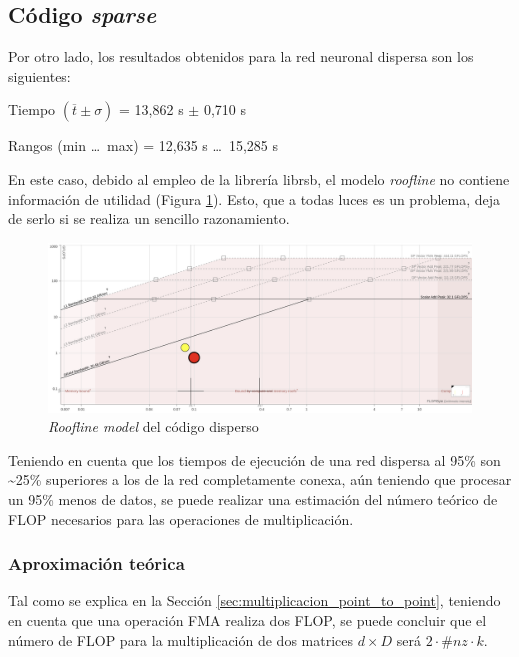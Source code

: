 \subsection{Código \textit{sparse}}
Por otro lado, los resultados obtenidos para la red neuronal dispersa son los siguientes:

\begin{center}
Tiempo $(\overline{t} \pm \sigma)$ = 13,862 s $\pm$ 0,710 s

Rangos (min \ldots\ max) = 12,635 s \ldots\ 15,285 s
\end{center}

En este caso, debido al empleo de la librería librsb, el modelo \textit{roofline} no contiene información de utilidad (Figura \ref{fig:roofline_sparse_details}). Esto, que a todas luces es un problema, deja de serlo si se realiza un sencillo razonamiento.

\begin{figure}[h!]
    \centering
    \includegraphics[width=\textwidth]{img/roofline_sparse.png}
    \caption{\textit{Roofline model} del código disperso}
    \label{fig:roofline_sparse_details}
\end{figure}

Teniendo en cuenta que los tiempos de ejecución de una red dispersa al 95\% son \textasciitilde25\% superiores a los de la red completamente conexa, aún teniendo que procesar un 95\% menos de datos, se puede realizar una estimación del número teórico de FLOP necesarios para las operaciones de multiplicación.

\subsubsection{Aproximación teórica}
Tal como se explica en la Sección \ref{sec:multiplicacion_point_to_point}, teniendo en cuenta que una operación FMA realiza dos FLOP, se puede concluir que el número de FLOP para la multiplicación de dos matrices $d\times D$ será $2 \cdot \#nz \cdot k$.

